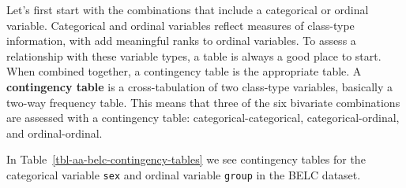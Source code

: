 \documentclass[
  letterpaper,
  DIV=11,
  numbers=noendperiod]{scrreprt}
\theoremstyle{definition}
\theoremstyle{remark}
\begin{document}
Let's first start with the combinations that include a categorical or
ordinal variable. Categorical and ordinal variables reflect measures of
class-type information, with add meaningful ranks to ordinal variables.
To assess a relationship with these variable types, a table is always a
good place to start. When combined together, a contingency table is the
appropriate table. A \textbf{contingency table} is a cross-tabulation of
two class-type variables, basically a two-way frequency table. This
means that three of the six bivariate combinations are assessed with a
contingency table: categorical-categorical, categorical-ordinal, and
ordinal-ordinal.

In Table~\ref{tbl-aa-belc-contingency-tables} we see contingency tables
for the categorical variable \texttt{sex} and ordinal variable
\texttt{group} in the BELC dataset.

\begin{table}

\caption{\label{tbl-aa-belc-contingency-tables}Contingency tables for
categorical variable \texttt{sex} and ordinal variable \texttt{group} in
the BELC dataset.}

\begin{minipage}{0.50\linewidth}



\end{minipage}%
%
\begin{minipage}{0.50\linewidth}



\end{minipage}%

\end{table}%
\end{document}
